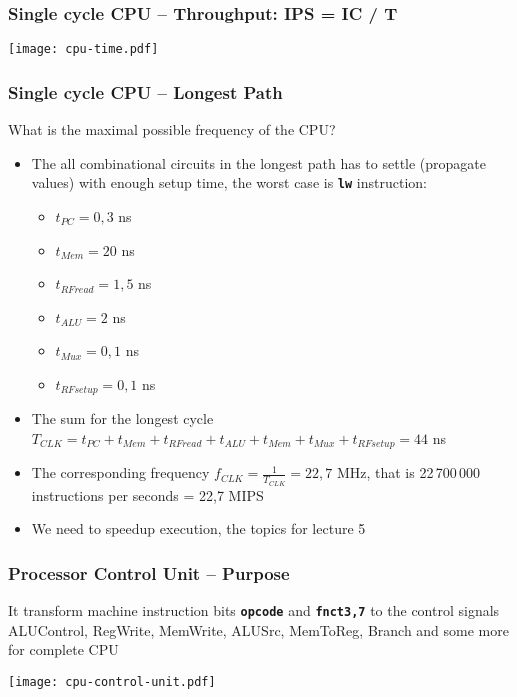 \documentclass{beamer}
\begin{document}
\begin{frame}
\frametitle{Single cycle CPU – Throughput: IPS = IC / T}

\bigskip

\texttt{[image: cpu-time.pdf]}

\end{frame}

\begin{frame}
\frametitle{Single cycle CPU – Longest Path}

What is the maximal possible frequency of the CPU?
\begin{itemize}
\item The all combinational circuits in the longest path has to settle (propagate values) with enough setup time, the worst case is \texttt{\textbf{lw}} instruction:
\begin{itemize}
\item $t_{PC} = 0,3$ ns
\item $t_{Mem} = 20$ ns
\item $t_{RFread} = 1,5$ ns
\item $t_{ALU} = 2$ ns
\item $t_{Mux} = 0,1$ ns
\item $t_{RFsetup} = 0,1$ ns
\end{itemize}
\item The sum for the longest cycle $T_{CLK} = t_{PC} + t_{Mem} + t_{RFread} + t_{ALU} + t_{Mem} + t_{Mux} + t_{RFsetup} = 44$ ns
\item The corresponding frequency $f_{CLK} = \frac{1}{T_{CLK}} = 22,7$ MHz, that is 22\,700\,000 instructions per seconds = 22,7 MIPS
\item We need to speedup execution, the topics for lecture 5
\end{itemize}
\end{frame}


\begin{frame}
\frametitle{Processor Control Unit -- Purpose}

It transform machine instruction bits \texttt{\textbf{opcode}} and \texttt{\textbf{fnct3,7}} to the control signals ALUControl, RegWrite, MemWrite, ALUSrc, MemToReg, Branch and some more for complete CPU

\bigskip
\begin{center}
\texttt{[image: cpu-control-unit.pdf]}
\end{center}
\end{frame}
\end{document}
